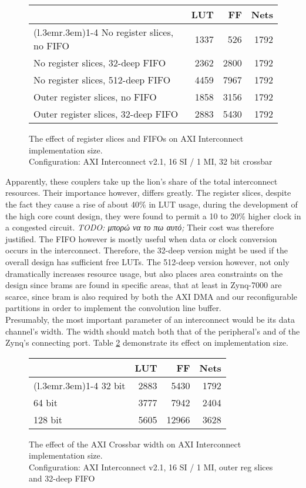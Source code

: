 \begin{figure}[ht!]
\centering
\begin{tabular}{lrrr}
\toprule
	& LUT	& FF	& Nets \\
\cmidrule(l{.3em}r{.3em}){1-4}
No register slices, no FIFO		& 1337 & 526 & 1792 \\
No register slices, 32-deep FIFO	& 2362 & 2800 & 1792 \\
No register slices, 512-deep FIFO	& 4459 & 7967 & 1792 \\
Outer register slices, no FIFO		& 1858 & 3156 & 1792 \\
Outer register slices, 32-deep FIFO	& 2883 & 5430 & 1792 \\
\bottomrule
\end{tabular}
\caption{The effect of register slices and FIFOs on AXI Interconnect implementation size.\\
	Configuration: AXI Interconnect v2.1, 16 SI / 1 MI, 32 bit crossbar}
\label{tab:int-reg}
\end{figure}

Apparently, these couplers take up the lion's share of the total interconnect resources.
Their importance however, differs greatly.
The register slices, despite the fact they cause a rise of about 40\% in LUT usage,
during the development of the high core count design,
they were found to permit a 10 to 20\% higher clock in a congested circuit.
\emph{TODO: μπορώ να το πω αυτό;}
Their cost was therefore justified.
The FIFO however is mostly useful when data or clock conversion occurs in the
interconnect. Therefore, the 32-deep version might be used if the overall design
has sufficient free LUTs. The 512-deep version however,
not only dramatically increases resource usage, but also places area constraints on
the design since \glspl{bram} are found in specific areas, that at least in Zynq-7000
are scarce, since \gls{bram} is also required by both the AXI DMA and our reconfigurable
partitions in order to implement the convolution line buffer.
\\

Presumably, the most important parameter of an interconnect would be its data channel's width.
The width should match both that of the peripheral's and of the Zynq's connecting port.
Table \ref{tab:int-width} demonstrate its effect on implementation size.

\begin{figure}[ht!]
\centering
\begin{tabular}{lrrr}
\toprule
	& LUT	& FF	& Nets \\
\cmidrule(l{.3em}r{.3em}){1-4}
32 bit	& 2883	& 5430	& 1792 \\
64 bit	& 3777	& 7942	& 2404 \\
128 bit	& 5605	& 12966	& 3628 \\
\bottomrule
\end{tabular}
\caption{The effect of the AXI Crossbar width on AXI Interconnect implementation size.\\
	Configuration: AXI Interconnect v2.1, 16 SI / 1 MI, outer reg slices and 32-deep FIFO}
\label{tab:int-width}
\end{figure}

